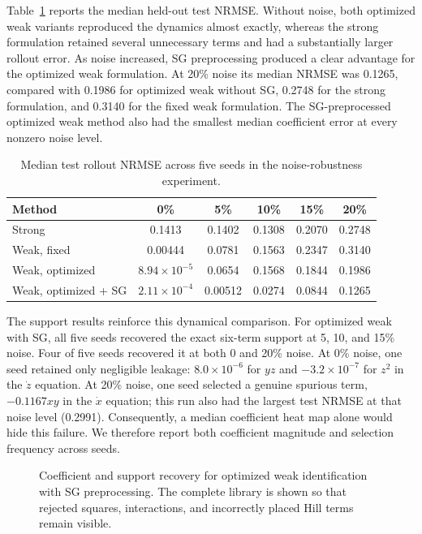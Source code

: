 Table~\ref{tab:goodwin-rollout-nrmse} reports the median held-out test NRMSE\@.
Without noise, both optimized weak variants reproduced the dynamics almost
exactly, whereas the strong formulation retained several unnecessary terms and
had a substantially larger rollout error.  As noise increased, SG
preprocessing produced a clear advantage for the optimized weak formulation.
At 20\% noise its median NRMSE was 0.1265, compared with 0.1986 for optimized
weak without SG, 0.2748 for the strong formulation, and 0.3140 for the fixed
weak formulation.  The SG-preprocessed optimized weak method also had the
smallest median coefficient error at every nonzero noise level.

\begin{table}[t]
    \centering
    \caption{Median test rollout NRMSE across five seeds in the noise-robustness
    experiment.}
    \label{tab:goodwin-rollout-nrmse}
    \begin{tabular}{lccccc}
        \hline
        Method & 0\% & 5\% & 10\% & 15\% & 20\% \\
        \hline
        Strong & 0.1413 & 0.1402 & 0.1308 & 0.2070 & 0.2748 \\
        Weak, fixed & 0.00444 & 0.0781 & 0.1563 & 0.2347 & 0.3140 \\
        Weak, optimized & $8.94\times10^{-5}$ & 0.0654 & 0.1568 & 0.1844 & 0.1986 \\
        Weak, optimized + SG & $2.11\times10^{-4}$ & 0.00512 & 0.0274 & 0.0844 & 0.1265 \\
        \hline
    \end{tabular}
\end{table}

The support results reinforce this dynamical comparison.  For optimized weak
with SG, all five seeds recovered the exact six-term support at 5, 10, and
15\% noise.  Four of five seeds recovered it at both 0 and 20\% noise.  At
0\% noise, one seed retained only negligible leakage: $8.0\times10^{-6}$ for
$yz$ and $-3.2\times10^{-7}$ for $z^2$ in the $\dot z$ equation.  At 20\%
noise, one seed selected a genuine spurious term, $-0.1167xy$ in the
$\dot x$ equation; this run also had the largest test NRMSE at that noise
level (0.2991).  Consequently, a median coefficient heat map alone would hide
this failure.  We therefore report both coefficient magnitude and selection
frequency across seeds.

\begin{figure}[t]
    \centering
    \caption{Coefficient and support recovery for optimized weak identification
    with SG preprocessing.  The complete library is shown so that rejected
    squares, interactions, and incorrectly placed Hill terms remain visible.}
    \label{fig:goodwin-complete-coefficients}
\end{figure}

